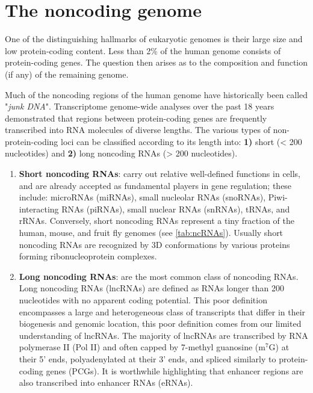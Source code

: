 \section[The noncoding genome]{The noncoding genome}
\label{sec:noncoding-genome}

One of the distinguishing hallmarks of eukaryotic genomes is their large size and low protein-coding content. Less than 2\% of the human genome consists of protein-coding genes.\autocite{djebali_2012_landscape} The question then arises as to the composition and function (if any) of the remaining genome.

Much of the noncoding regions of the human genome have historically been called "\textit{junk DNA}". Transcriptome genome-wide analyses over the past 18 years demonstrated that regions between protein-coding genes are frequently transcribed into RNA molecules of diverse lengths.\autocite{kapranov_2007_lncRNA,guttman_2009_chromatin,derrien_2012_gencode,brown_2014} The various types of non-protein-coding loci can be classified according to its length into: \textbf{1)} short (< 200 nucleotides) and \textbf{2)} long noncoding RNAs (> 200 nucleotides).

\begin{enumerate}
\item \textbf{Short noncoding RNAs}: carry out relative well-defined functions in cells, and are already accepted as fundamental players in gene regulation;\autocite{ulitsky_2018_interactions,pelechano_2013} these include: microRNAs (miRNAs), small nucleolar RNAs (snoRNAs), Piwi-interacting RNAs (piRNAs), small nuclear RNAs (snRNAs), tRNAs, and rRNAs. Conversely, short noncoding RNAs represent a tiny fraction of the human, mouse, and fruit fly genomes (see \autoref{tab:ncRNAs}). Usually short noncoding RNAs are recognized by 3D conformations by various proteins forming ribonucleoprotein complexes.\autocite{jarroux_2017_history,ulitsky_2018_interactions} 

\item \textbf{Long noncoding RNAs}: are the most common class of noncoding RNAs. Long noncoding RNAs (lncRNAs) are defined as RNAs longer than 200 nucleotides with no apparent coding potential. This poor definition encompasses a large and heterogeneous class of transcripts that differ in their biogenesis and genomic location, this poor definition comes from our limited understanding of lncRNAs. The majority of lncRNAs are transcribed by RNA polymerase II (Pol II) and often capped by 7-methyl guanosine (m$^7$G) at their 5’ ends, polyadenylated at their 3’ ends, and spliced similarly to protein-coding genes (PCGs).\autocite{statello_2021_lncRNA_reg,kopp_2018_functional} It is worthwhile highlighting that enhancer regions are also transcribed into enhancer RNAs (eRNAs).\autocite{statello_2021_lncRNA_reg,kim_2015_erna}

\end{enumerate}

